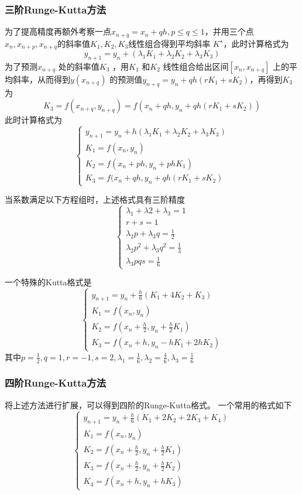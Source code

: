\documentclass[a4paper]{article}
\begin{document}
\subsubsection{三阶Runge-Kutta方法}
为了提高精度再额外考察一点$x_{n+q} = x_{n} + q h, p \le q \le 1$，并用三个点$x_{n}, x_{n+p}, x_{n+q}$的斜率值$K_1,K_2,K_3$线性组合得到平均斜率 $K^{\star}$，此时计算格式为
\[
y_{n+1} = y_{n} + (\lambda_1 K_1 + \lambda_2 K_2 + \lambda_3 K_3)
\] 
为了预测$x_{n+q}$ 处的斜率值$K_3$ ，用$K_1$ 和$K_2$ 线性组合给出区间$[x_{n},x_{n+q}]$ 上的平均斜率，从而得到$y(x_{n+q})$ 的预测值$y_{n+q} = y_{n} + q h (r K_1 + s K_2)$，再得到$K_3$ 为
\[
K_3 = f(x_{n+q}, y_{n+q}) = f(x_{n} + q h, y_{n} + qh (r K_1 + s K_2))
\] 
此时计算格式为
\[
\tag{4.3.7} \label{eq:4.3.7} 
\begin{cases}
	y_{n+1} = y_{n} + h (\lambda_1 K_1 + \lambda_2 K_2 + \lambda_3 K_3) \\
	K_1 = f(x_{n}, y_{n}) \\
	K_2 = f(x_{n} + p h, y_{n} + p h K_1) \\
	K_3 = f(x_{n} + q h, y_{n} + q h (r K_1 + s K_2)
\end{cases} 
\] 

当系数满足以下方程组时，上述格式具有三阶精度
\[
\tag{4.3.8} \label{eq:4.3.8} 
\begin{cases}
	\lambda_1 + \lambda 2 + \lambda_3 = 1 \\
	r + s = 1 \\
	\lambda_2 p + \lambda_3 q = \frac{1}{2} \\
	\lambda_2 p^2 + \lambda_3 q^2 = \frac{1}{3} \\
	\lambda_3 p q s = \frac{1}{6}
\end{cases} 
\] 

一个特殊的Kutta格式是
\[
\begin{cases}
	y_{n+1} = y_{n} + \frac{h}{6}(K_1 + 4 K_2 + K_3) \\
	K_1 = f(x_{n}, y_{n}) \\
	K_2 = f(x_{n} + \frac{h}{2}, y_{n} + \frac{h}{2} K_1) \\
	K_3 = f(x_{n} + h, y_{n} - h K_1 + 2 h K_2)
\end{cases} 
\] 
其中$p = \frac{1}{2}, q = 1, r = -1, s = 2, \lambda_1 = \frac{1}{6}, \lambda_2 = \frac{4}{6}, \lambda_3 = \frac{1}{6}$

\subsubsection{四阶Runge-Kutta方法}
将上述方法进行扩展，可以得到四阶的Runge-Kutta格式。
一个常用的格式如下
\[
\tag{4.3.9} \label{eq:4.3.9} 
\begin{cases}
	y_{n+1} = y_{n} + \frac{h}{6}(K_1 + 2 K_2 + 2 K_3 + K_4) \\
	K_1 = f(x_{n}, y_{n}) \\
	K_2 = f(x_{n} + \frac{h}{2}, y_{n} + \frac{h}{2} K_1) \\
	K_3 = f(x_{n} + \frac{h}{2}, y_{n} + \frac{h}{2} K_2) \\
	K_4 = f(x_{n} + h, y_{n} + h K_3)
\end{cases} 
\] 
\end{document}
